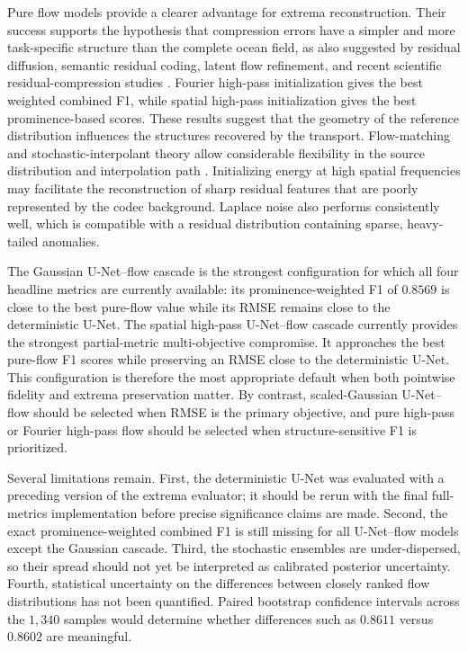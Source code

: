 \documentclass[11pt]{article}
\begin{document}
Pure flow models provide a clearer advantage for extrema reconstruction. Their success supports the hypothesis that compression errors have a simpler and more task-specific structure than the complete ocean field, as also suggested by residual diffusion, semantic residual coding, latent flow refinement, and recent scientific residual-compression studies \cite{ghouse2023residual,liu2024residual,ke2025ultra,huang2026flowcodec,zhu2026residual}. Fourier high-pass initialization gives the best weighted combined F1, while spatial high-pass initialization gives the best prominence-based scores. These results suggest that the geometry of the reference distribution influences the structures recovered by the transport. Flow-matching and stochastic-interpolant theory allow considerable flexibility in the source distribution and interpolation path \cite{lipman2022flow,liu2022flow,albergo2022building}. Initializing energy at high spatial frequencies may facilitate the reconstruction of sharp residual features that are poorly represented by the codec background. Laplace noise also performs consistently well, which is compatible with a residual distribution containing sparse, heavy-tailed anomalies.

The Gaussian U-Net--flow cascade is the strongest configuration for which all four headline metrics are currently available: its prominence-weighted F1 of $0.8569$ is close to the best pure-flow value while its RMSE remains close to the deterministic U-Net. The spatial high-pass U-Net--flow cascade currently provides the strongest partial-metric multi-objective compromise. It approaches the best pure-flow F1 scores while preserving an RMSE close to the deterministic U-Net. This configuration is therefore the most appropriate default when both pointwise fidelity and extrema preservation matter. By contrast, scaled-Gaussian U-Net--flow should be selected when RMSE is the primary objective, and pure high-pass or Fourier high-pass flow should be selected when structure-sensitive F1 is prioritized.

Several limitations remain. First, the deterministic U-Net was evaluated with a preceding version of the extrema evaluator; it should be rerun with the final full-metrics implementation before precise significance claims are made. Second, the exact prominence-weighted combined F1 is still missing for all U-Net--flow models except the Gaussian cascade. Third, the stochastic ensembles are under-dispersed, so their spread should not yet be interpreted as calibrated posterior uncertainty. Fourth, statistical uncertainty on the differences between closely ranked flow distributions has not been quantified. Paired bootstrap confidence intervals across the $1{,}340$ samples would determine whether differences such as $0.8611$ versus $0.8602$ are meaningful.
\end{document}
